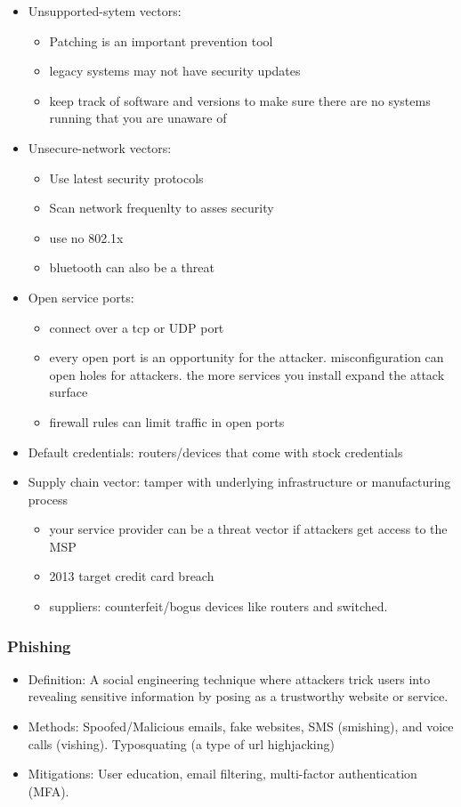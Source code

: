 \documentclass[11pt]{article}
\begin{document}
\begin{itemize}
\item Unsupported-sytem vectors:
\begin{itemize}
\item Patching is an important prevention tool
\item legacy systems may not have security updates
\item keep track of software and versions to make sure there are no systems running that you are unaware of
\end{itemize}

\item Unsecure-network vectors:
\begin{itemize}
\item Use latest security protocols
\item Scan network frequenlty to asses security
\item use no 802.1x
\item bluetooth can also be a threat
\end{itemize}

\item Open service ports:
\begin{itemize}
\item connect over a tcp or UDP port
\item every open port is an opportunity for the attacker. misconfiguration can open holes for attackers. the more services you install expand the attack surface
\item firewall rules can limit traffic in open ports
\end{itemize}

\item Default credentials: routers/devices that come with stock credentials

\item Supply chain vector: tamper with underlying infrastructure or manufacturing process
\begin{itemize}
\item your service provider can be a threat vector if attackers get access to the MSP
\item 2013 target credit card breach
\item suppliers: counterfeit/bogus devices like routers and switched.
\end{itemize}
\end{itemize}
\subsubsection{Phishing}
\label{sec:org1c37dca}
\begin{itemize}
\item Definition: A social engineering technique where attackers trick users into revealing sensitive information by posing as a trustworthy website or service.
\item Methods: Spoofed/Malicious emails, fake websites, SMS (smishing), and voice calls (vishing). Typosquating (a type of url highjacking)
\item Mitigations: User education, email filtering, multi-factor authentication (MFA).
\end{itemize}
\end{document}
